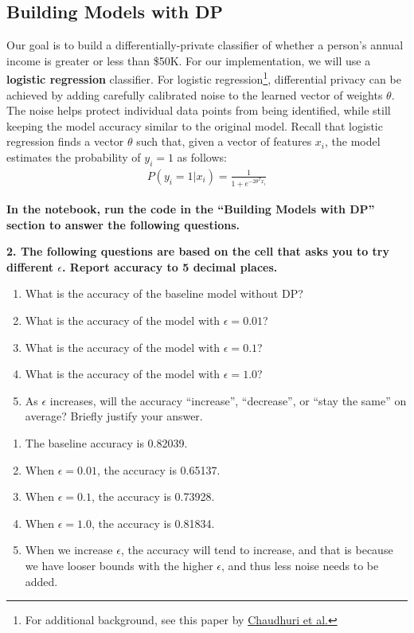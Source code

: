 \documentclass{article}
\begin{document}
\bigskip


\subsection*{Building Models with DP}

Our goal is to build a differentially-private classifier of whether a person's annual income is greater or less than \$50K. For our implementation, we will use a \textbf{logistic regression} classifier. For logistic regression\footnote{For additional background, see this paper by \href{https://systems.cs.columbia.edu/private-systems-class/papers/Chaudhuri2009Privacy.pdf}{Chaudhuri et al.}}, differential privacy can be achieved by adding carefully calibrated noise to the learned vector of weights $\theta$. The noise helps protect individual data points from being identified, while still keeping the model accuracy similar to the original model. Recall that logistic regression finds a vector $\theta$ such that, given a vector of features $x_i$, the model estimates the probability of $y_i = 1$ as follows:
\begin{align}
    P(y_i = 1|x_i) = \frac{1}{1 + e^{-2\theta^{T}x_i}}
\end{align}

\textbf{In the notebook, run the code in the ``Building Models with DP'' section to answer the following questions.}

\textbf{2. The following questions are based on the cell that asks you to try different $\epsilon$. Report accuracy to 5 decimal places.}

\begin{enumerate}[label=\Alph*.]
    \item What is the accuracy of the baseline model without DP?
    \item What is the accuracy of the model with $\epsilon=0.01$?
    \item What is the accuracy of the model with $\epsilon=0.1$?
    \item What is the accuracy of the model with $\epsilon=1.0$?
    \item As $\epsilon$ increases, will the accuracy ``increase'', ``decrease'', or ``stay the same'' on average? Briefly justify your answer.
\end{enumerate}


\bigskip
\begin{mdframed}
\begin{enumerate}[label=\Alph*.]
    \item The baseline accuracy is 0.82039.
    \item When $\epsilon = 0.01$, the accuracy is 0.65137.
    \item When $\epsilon = 0.1$, the accuracy is 0.73928.
    \item When $\epsilon = 1.0$, the accuracy is 0.81834.
    \item When we increase $\epsilon$, the accuracy will tend to increase, and that is because we have looser bounds with the higher $\epsilon$, and thus less noise needs to be added.
\end{enumerate}
\end{mdframed}
\bigskip
\end{document}
